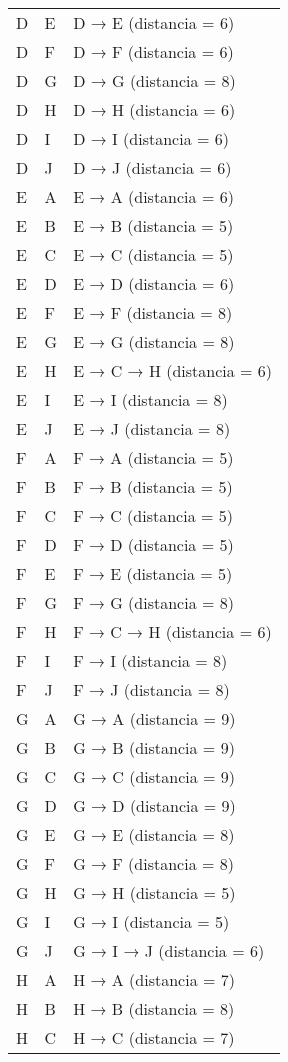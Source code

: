 \documentclass{article}
\begin{document}
\begin{longtable}{llp{}}
D & E & D → E (distancia = 6)\\
D & F & D → F (distancia = 6)\\
D & G & D → G (distancia = 8)\\
D & H & D → H (distancia = 6)\\
D & I & D → I (distancia = 6)\\
D & J & D → J (distancia = 6)\\
E & A & E → A (distancia = 6)\\
E & B & E → B (distancia = 5)\\
E & C & E → C (distancia = 5)\\
E & D & E → D (distancia = 6)\\
E & F & E → F (distancia = 8)\\
E & G & E → G (distancia = 8)\\
E & H & E → C → H (distancia = 6)\\
E & I & E → I (distancia = 8)\\
E & J & E → J (distancia = 8)\\
F & A & F → A (distancia = 5)\\
F & B & F → B (distancia = 5)\\
F & C & F → C (distancia = 5)\\
F & D & F → D (distancia = 5)\\
F & E & F → E (distancia = 5)\\
F & G & F → G (distancia = 8)\\
F & H & F → C → H (distancia = 6)\\
F & I & F → I (distancia = 8)\\
F & J & F → J (distancia = 8)\\
G & A & G → A (distancia = 9)\\
G & B & G → B (distancia = 9)\\
G & C & G → C (distancia = 9)\\
G & D & G → D (distancia = 9)\\
G & E & G → E (distancia = 8)\\
G & F & G → F (distancia = 8)\\
G & H & G → H (distancia = 5)\\
G & I & G → I (distancia = 5)\\
G & J & G → I → J (distancia = 6)\\
H & A & H → A (distancia = 7)\\
H & B & H → B (distancia = 8)\\
H & C & H → C (distancia = 7)\\

\end{longtable}
\end{document}
